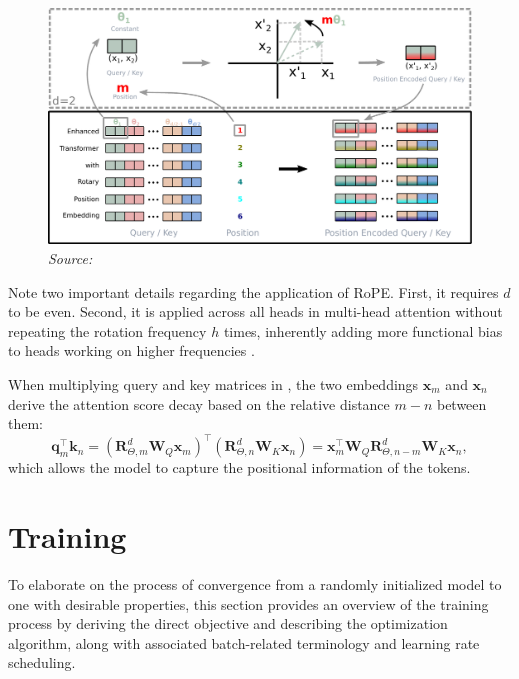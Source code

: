 \begin{figure}[ht]
    \centering
    \includegraphics[width=\textwidth]{figures/rope.pdf}
    \label{fig:rope}
    \hfill\textit{Source: \citet{su2021}}
\end{figure}

Note two important details regarding the application of RoPE. First, it requires \(d\) to be even. Second, it is applied across all heads in multi-head attention without repeating the rotation frequency \(h\) times, inherently adding more functional bias to heads working on higher frequencies \parencite{barbero2024}.

\newpage
When multiplying query and key matrices in , the two embeddings \(\mathbf{x}_m\) and \(\mathbf{x}_n\) derive the attention score decay based on the relative distance \(m-n\) between them:
\begin{equation}
	\mathbf{q}_m^{\top}\mathbf{k}_n
	=(\mathbf{R}^d_{\Theta, m}\mathbf{W}_Q\mathbf{x}_m)^\top(\mathbf{R}^d_{\Theta, n}\mathbf{W}_K\mathbf{x}_n) =\mathbf{x}_m^\top\mathbf{W}_Q\mathbf{R}^d_{\Theta, n-m}\mathbf{W}_K\mathbf{x}_n,
\end{equation}
which allows the model to capture the positional information of the tokens.

\section{Training}

To elaborate on the process of convergence from a randomly initialized model to one with desirable properties, this section provides an overview of the training process by deriving the direct objective and describing the optimization algorithm, along with associated batch-related terminology and learning rate scheduling.

